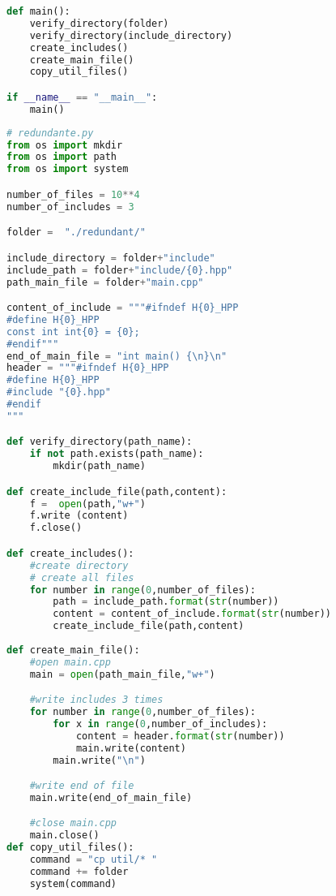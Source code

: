 \begin{apendicesenv}
\begin{lstlisting}[language=Python, caption={
                     Script Pragma Once},
             label=script_pragma_once_include]
def main():
    verify_directory(folder)
    verify_directory(include_directory)
    create_includes()
    create_main_file()
    copy_util_files()

if __name__ == "__main__":
    main()
\end{lstlisting}

\begin{lstlisting}[language=Python,caption={
     Script Redundancia de Guardas de Inclusão},
                 label=script_redundante_include]
# redundante.py
from os import mkdir
from os import path
from os import system

number_of_files = 10**4
number_of_includes = 3

folder =  "./redundant/"

include_directory = folder+"include"
include_path = folder+"include/{0}.hpp"
path_main_file = folder+"main.cpp"

content_of_include = """#ifndef H{0}_HPP
#define H{0}_HPP
const int int{0} = {0};
#endif"""
end_of_main_file = "int main() {\n}\n"
header = """#ifndef H{0}_HPP
#define H{0}_HPP
#include "{0}.hpp"
#endif
"""

def verify_directory(path_name):
    if not path.exists(path_name):
        mkdir(path_name)

def create_include_file(path,content):
    f =  open(path,"w+")
    f.write (content)
    f.close()

def create_includes():
    #create directory
    # create all files
    for number in range(0,number_of_files):
        path = include_path.format(str(number))
        content = content_of_include.format(str(number))
        create_include_file(path,content)
    
def create_main_file():
    #open main.cpp
    main = open(path_main_file,"w+")

    #write includes 3 times
    for number in range(0,number_of_files):
        for x in range(0,number_of_includes):
            content = header.format(str(number))
            main.write(content)
        main.write("\n")

    #write end of file
    main.write(end_of_main_file)

    #close main.cpp
    main.close()
def copy_util_files():                                                           
    command = "cp util/* "                                                       
    command += folder                                                            
    system(command)                                                              
                    


\end{lstlisting}
\end{apendicesenv}
